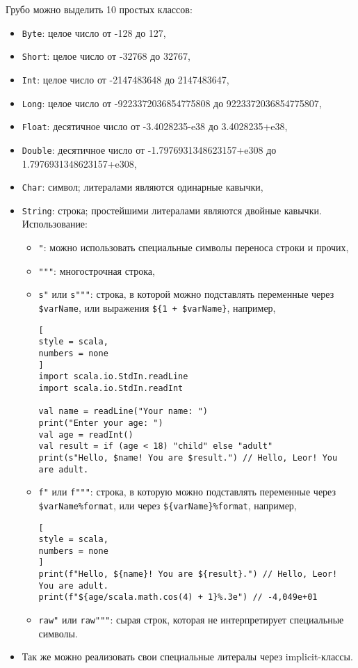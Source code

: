 \documentclass[%
	11pt,
	a4paper,
	utf8,
		]{article}
\begin{document}
Грубо можно выделить 10 простых классов:
\begin{itemize}
	\item \texttt{Byte}: целое число от -128 до 127,
	
	\item \texttt{Short}: целое число от -32768 до 32767,
	
	\item \texttt{Int}: целое число от -2147483648 до 2147483647,
	
	\item \texttt{Long}: целое число от -9223372036854775808 до 9223372036854775807,
	
	\item \texttt{Float}: десятичное число от -3.4028235-e38 до 3.4028235+e38,
	
	\item \texttt{Double}: десятичное число от -1.7976931348623157+e308 до 1.7976931348623157+e308,
	
	\item \texttt{Char}: символ; литералами являются одинарные кавычки,
	
	\item \texttt{String}: строка; простейшими литералами являются двойные кавычки. Использование:
	\begin{itemize}
		\item \texttt{"}: можно использовать специальные символы переноса строки и прочих,
		
		\item \verb|"""|: многострочная строка,
		
		\item \texttt{s"} или \verb|s"""|: строка, в которой можно подставлять переменные через \verb|$varName|, или выражения \verb|${1 + $varName}|, например,
\begin{lstlisting}[
style = scala,
numbers = none
]
import scala.io.StdIn.readLine
import scala.io.StdIn.readInt

val name = readLine("Your name: ")
print("Enter your age: ")
val age = readInt()
val result = if (age < 18) "child" else "adult"
print(s"Hello, $name! You are $result.") // Hello, Leor! You are adult.
\end{lstlisting}
		
		\item \texttt{f"} или \verb|f"""|: строка, в которую можно подставлять переменные через \verb|$varName%format|, или через \verb|${varName}%format|, например,
\begin{lstlisting}[
style = scala,
numbers = none
]
print(f"Hello, ${name}! You are ${result}.") // Hello, Leor! You are adult.
print(f"${age/scala.math.cos(4) + 1}%.3e") // -4,049e+01
\end{lstlisting}

    \item \verb|raw"| или \verb|raw"""|: сырая строк, которая не интерпретирует специальные символы.
	\end{itemize}
    \item Так же можно реализовать свои специальные литералы через implicit-классы.
\end{itemize}
\end{document}
